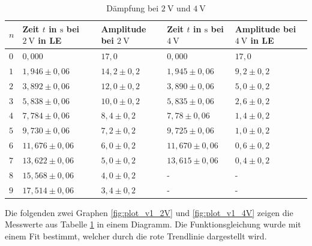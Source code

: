             \begin{table}[H]
                \centering
                \caption{Dämpfung bei $2\ \mathrm{V}$ und $4\ \mathrm{V}$}
                \vspace{0.5em}
                \begin{tabular}{|l|l|l||l|l|}
                    \hline
                    $n$ & Zeit $t$ in $\mathrm{s}$ bei $2\ \mathrm{V}$ in LE& Amplitude bei $2\ \mathrm{V}$ & Zeit $t$ in $\mathrm{s}$ bei $4\ \mathrm{V}$ & Amplitude bei $4\ \mathrm{V}$ in LE\\
                    \hline
                    \hline
                    $0$ & $0,000$ & $17,0$ & $0,000$ & $17,0$ \\
                    \hline
                    $1$ & $1,946 \pm 0,06$ & $14,2 \pm 0,2$ & $1,945 \pm 0,06$ & $9,2 \pm 0,2$ \\
                    \hline
                    $2$ & $3,892 \pm 0,06$ & $12,0 \pm 0,2$ & $3,890 \pm 0,06$ & $5,0 \pm 0,2$ \\
                    \hline
                    $3$ & $5,838 \pm 0,06$ & $10,0 \pm 0,2$ & $5,835 \pm 0,06$ & $2,6 \pm 0,2$ \\
                    \hline
                    $4$ & $7,784 \pm 0,06$ & $8,4 \pm 0,2$ & $7,78 \pm 0,06$ & $1,4 \pm 0,2$ \\
                    \hline
                    $5$ & $9,730 \pm 0,06$ & $7,2 \pm 0,2$ & $9,725 \pm 0,06$ & $1,0 \pm 0,2$ \\
                    \hline
                    $6$ & $11,676 \pm 0,06$ & $6,0 \pm 0,2$ & $11,670 \pm 0,06$ & $0,6 \pm 0,2$ \\
                    \hline
                    $7$ & $13,622 \pm 0,06$ & $5,0 \pm 0,2$ & $13,615 \pm 0,06$ & $0,4 \pm 0,2$ \\
                    \hline
                    $8$ & $15,568 \pm 0,06$ & $4,0 \pm 0,2$ & - & - \\
                    \hline
                    $9$ & $17,514 \pm 0,06$ & $3,4 \pm 0,2$ & - & - \\
                    \hline
                \end{tabular}
                \label{tab:ergebnisse_v1.2}
            \end{table}

            Die folgenden zwei Graphen \ref{fig:plot_v1_2V} und \ref{fig:plot_v1_4V} zeigen die Messwerte aus Tabelle \ref{tab:ergebnisse_v1.2} in einem Diagramm. Die Funktionsgleichung wurde mit einem Fit bestimmt, welcher durch die rote Trendlinie dargestellt wird.
            
